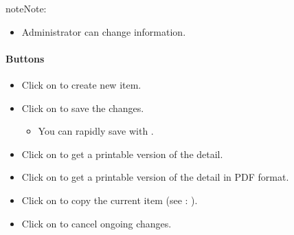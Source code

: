 \documentclass[letterpaper,10pt,english]{sphinxmanual}
\begin{document}
\begin{notice}{note}{Note:}\begin{itemize}
\item {} 
Administrator can change information.

\end{itemize}
\end{notice}
\newpage\paragraph{Buttons}
\begin{itemize}
\item {} 
Click on  to create new item.

\item {} 
Click on  to save the changes.
\begin{itemize}
\item {} 
You can rapidly save with .

\end{itemize}

\item {} 
Click on  to get a printable version of the detail.

\item {} 
Click on   to get a printable version of the detail in PDF format.

\item {} 
Click on  to copy the current item (see : {\hyperref[Gui:gui-copyandtransform-item-label]{\emph{}}}).

\item {} 
Click on  to cancel ongoing changes.


\end{itemize}
\end{document}
